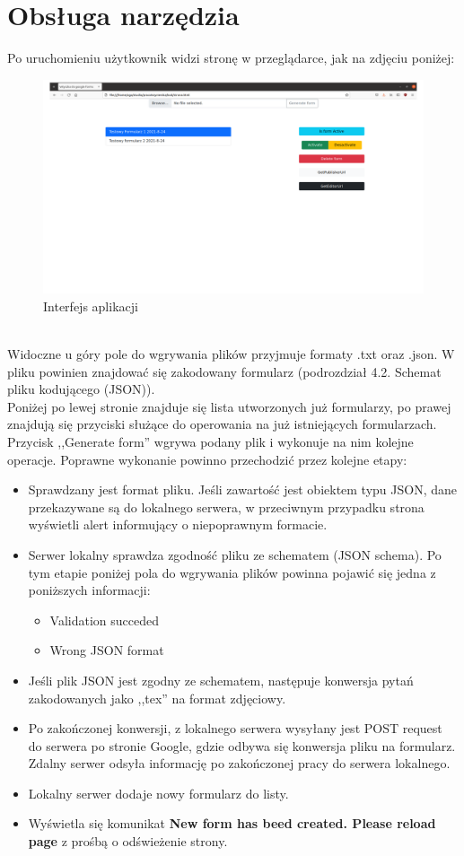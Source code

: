 \section{Obsługa narzędzia}
Po uruchomieniu użytkownik widzi stronę w przeglądarce, jak na zdjęciu poniżej:
\begin{figure}[H]
  \includegraphics{strona.png}
  \caption{Interfejs aplikacji}
  \label{fig:1}
\end{figure}
\\Widoczne u góry pole do wgrywania plików przyjmuje formaty .txt oraz .json. W pliku powinien znajdować się zakodowany formularz (podrozdział 4.2. Schemat pliku kodującego (JSON)).
\\Poniżej  po lewej stronie znajduje się lista utworzonych już formularzy, po prawej znajdują się przyciski służące do operowania na już istniejących formularzach.
\\Przycisk ,,Generate form'' wgrywa podany plik i  wykonuje na nim kolejne operacje. Poprawne wykonanie powinno przechodzić przez kolejne etapy:
\begin{itemize}
\item Sprawdzany jest format  pliku. Jeśli zawartość jest obiektem typu JSON, dane przekazywane są do lokalnego serwera, w przeciwnym przypadku strona wyświetli alert informujący o niepoprawnym formacie.
\item Serwer lokalny sprawdza zgodność pliku ze schematem (JSON schema). Po tym etapie poniżej pola do wgrywania plików powinna pojawić się jedna z poniższych informacji:
\begin{itemize}
\item Validation succeded
\item Wrong JSON format
\end{itemize}
\item Jeśli plik JSON jest zgodny ze schematem, następuje konwersja pytań zakodowanych jako ,,tex'' na format zdjęciowy. 
\item Po zakończonej konwersji, z lokalnego serwera wysyłany jest POST request do serwera po stronie Google, gdzie odbywa się konwersja pliku na formularz. Zdalny serwer odsyła informację po zakończonej pracy do serwera lokalnego.
\item Lokalny serwer dodaje nowy formularz do listy.
\item Wyświetla się komunikat \textbf{New form has beed created. Please reload page} z prośbą o odświeżenie strony.
\end{itemize}
